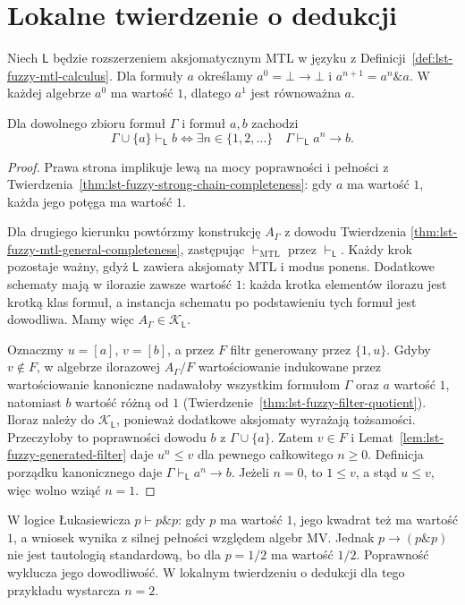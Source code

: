 \section{Lokalne twierdzenie o dedukcji}
Niech $\mathsf L$ będzie rozszerzeniem aksjomatycznym MTL
w języku z Definicji~\ref{def:lst-fuzzy-mtl-calculus}.
Dla formuły $a$ określamy $a^0=\bot\to\bot$ i
$a^{n+1}=a^n\mathbin{\&}a$. W każdej algebrze $a^0$ ma
wartość $1$, dlatego $a^1$ jest równoważna $a$.

\begin{twierdzenie}
\label{thm:lst-fuzzy-local-deduction}
Dla dowolnego zbioru formuł $\Gamma$ i formuł $a,b$ zachodzi
\[
 \Gamma\cup\{a\}\vdash_{\mathsf L} b
 \iff
 \exists n\in\{1,2,\ldots\}\quad
 \Gamma\vdash_{\mathsf L} a^n\to b.
\]
\end{twierdzenie}
\begin{proof}
Prawa strona implikuje lewą na mocy poprawności i pełności
z Twierdzenia~\ref{thm:lst-fuzzy-strong-chain-completeness}:
gdy $a$ ma wartość $1$, każda jego potęga ma wartość $1$.

Dla drugiego kierunku powtórzmy konstrukcję
$A_\Gamma$ z dowodu Twierdzenia
\ref{thm:lst-fuzzy-mtl-general-completeness}, zastępując
$\vdash_{\mathrm{MTL}}$ przez $\vdash_{\mathsf L}$.
Każdy krok pozostaje ważny, gdyż $\mathsf L$ zawiera
aksjomaty MTL i modus ponens. Dodatkowe schematy mają
w ilorazie zawsze wartość $1$: każda krotka elementów
ilorazu jest krotką klas formuł, a instancja schematu
po podstawieniu tych formuł jest dowodliwa.
Mamy więc $A_\Gamma\in\mathcal K_{\mathsf L}$.

Oznaczmy $u=[a]$, $v=[b]$, a przez $F$ filtr generowany
przez $\{1,u\}$. Gdyby $v\notin F$, w algebrze
ilorazowej $A_\Gamma/F$ wartościowanie indukowane
przez wartościowanie kanoniczne nadawałoby wszystkim
formułom $\Gamma$ oraz $a$ wartość $1$, natomiast
$b$ wartość różną od $1$
(Twierdzenie~\ref{thm:lst-fuzzy-filter-quotient}).
Iloraz należy do $\mathcal K_{\mathsf L}$, ponieważ
dodatkowe aksjomaty wyrażają tożsamości.
Przeczyłoby to poprawności dowodu $b$ z $\Gamma\cup\{a\}$.
Zatem $v\in F$ i Lemat~\ref{lem:lst-fuzzy-generated-filter}
daje $u^n\leq v$ dla pewnego całkowitego $n\geq0$.
Definicja porządku kanonicznego daje
$\Gamma\vdash_{\mathsf L}a^n\to b$.
Jeżeli $n=0$, to $1\leq v$, a stąd $u\leq v$,
więc wolno wziąć $n=1$.
\end{proof}
\begin{przyklad}
\label{ex:lst-fuzzy-no-global-deduction}
W logice Łukasiewicza $p\vdash p\mathbin{\&}p$:
gdy $p$ ma wartość $1$, jego kwadrat też ma wartość $1$,
a wniosek wynika z silnej pełności względem algebr MV.
Jednak $p\to(p\mathbin{\&}p)$ nie jest tautologią standardową,
bo dla $p=1/2$ ma wartość $1/2$. Poprawność wyklucza
jego dowodliwość. W lokalnym twierdzeniu o dedukcji
dla tego przykładu wystarcza $n=2$.
\end{przyklad}
